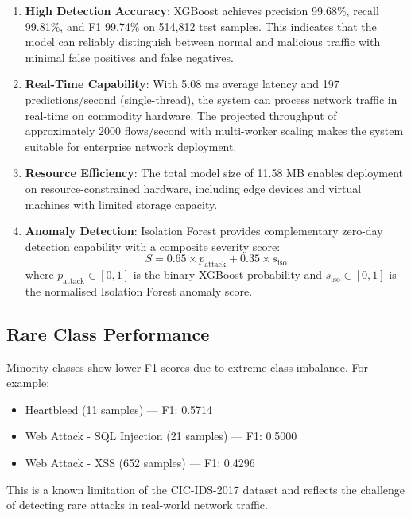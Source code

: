 \documentclass[12pt,a4paper]{report}
\begin{document}
\begin{enumerate}
    \item \textbf{High Detection Accuracy}: XGBoost achieves precision 99.68\%, recall 99.81\%, and F1 99.74\% on 514,812 test samples. This indicates that the model can reliably distinguish between normal and malicious traffic with minimal false positives and false negatives.

    \item \textbf{Real-Time Capability}: With 5.08 ms average latency and 197 predictions/second (single-thread), the system can process network traffic in real-time on commodity hardware. The projected throughput of approximately 2000 flows/second with multi-worker scaling makes the system suitable for enterprise network deployment.

    \item \textbf{Resource Efficiency}: The total model size of 11.58 MB enables deployment on resource-constrained hardware, including edge devices and virtual machines with limited storage capacity.

    \item \textbf{Anomaly Detection}: Isolation Forest provides complementary zero-day detection capability with a composite severity score:
    \begin{equation}
    S = 0.65 \times p_{\text{attack}} + 0.35 \times s_{\text{iso}}
    \end{equation}
    where \(p_{\text{attack}} \in [0,1]\) is the binary XGBoost probability and \(s_{\text{iso}} \in [0,1]\) is the normalised Isolation Forest anomaly score.
\end{enumerate}

\subsection{Rare Class Performance}

Minority classes show lower F1 scores due to extreme class imbalance. For example:

\begin{itemize}
    \item Heartbleed (11 samples) — F1: 0.5714
    \item Web Attack - SQL Injection (21 samples) — F1: 0.5000
    \item Web Attack - XSS (652 samples) — F1: 0.4296
\end{itemize}

This is a known limitation of the CIC-IDS-2017 dataset and reflects the challenge of detecting rare attacks in real-world network traffic.
\end{document}
